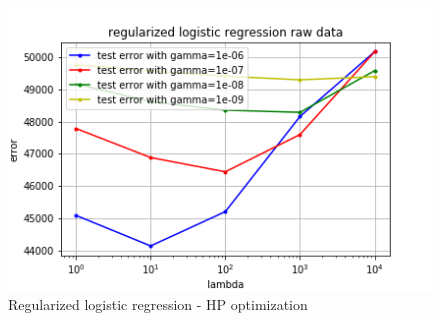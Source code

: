 \documentclass[11pt, a4paper, twoside]{article}
\begin{document}
\begin{figure}[h!]
  \includegraphics[width=0.5\linewidth]{plots/raw_data_reg_log_regr.png}
  \caption{Regularized logistic regression - HP optimization}
  \label{fig:raw_reg_log_regr}
\end{figure}
\end{document}
